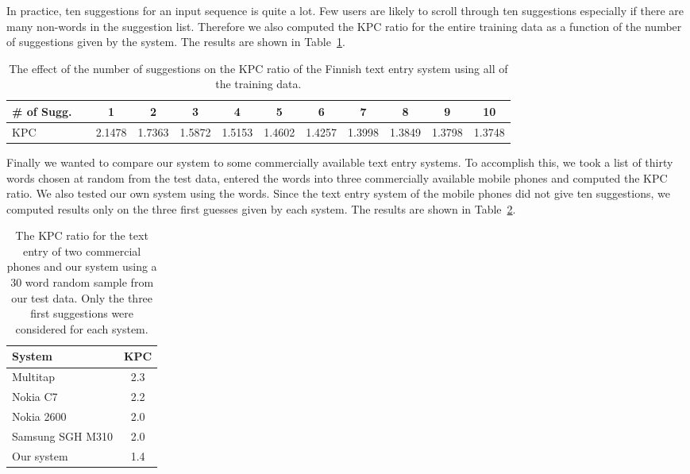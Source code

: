 \documentclass{llncs}
\begin{document}
In practice, ten suggestions for an input sequence is quite a lot. Few
users are likely to scroll through ten suggestions especially if there
are many non-words in the suggestion list. Therefore we also computed
the KPC ratio for the entire training data as a function of the number
of suggestions given by the system. The results are shown in
Table~\ref{fi-kpc-suggestions}.

\begin{table}
\caption{The effect of the number of suggestions on the KPC ratio of the Finnish text entry system using all of the training data.}\label{fi-kpc-suggestions}
\begin{center}
\begin{tabular}{lcccccccccc}
\hline
\# of Sugg.~~&  1 & 2 & 3 & 4 & 5 & 6 & 7 & 8 & 9 & 10\\
\hline
KPC & 2.1478 & 1.7363 & 1.5872 & 1.5153 & 1.4602 & 1.4257 & 1.3998 & 1.3849 & 1.3798 & 1.3748\\
\hline
\end{tabular}
\end{center}
\end{table}

Finally we wanted to compare our system to some commercially available
text entry systems. To accomplish this, we took a list of thirty words
chosen at random from the test data, entered the words into three
commercially available mobile phones and computed the KPC ratio. We
also tested our own system using the words. Since the text entry
system of the mobile phones did not give ten suggestions, we computed
results only on the three first guesses given by each system. The
results are shown in Table~\ref{mobile-phone-kpc}.

\begin{table}
\caption{The KPC ratio for the text entry of two commercial phones and
  our system using a $30$ word random sample from our test data. Only
  the three first suggestions were considered for each system.}\label{mobile-phone-kpc}
\begin{center}
\begin{tabular}{lc}
\hline
System & KPC\\
\hline
Multitap         & 2.3\\
Nokia C7         & 2.2\\
Nokia 2600       & 2.0\\
Samsung SGH M310 & 2.0\\
Our system       & 1.4\\
\hline
\end{tabular}
\end{center}
\end{table}
\end{document}
